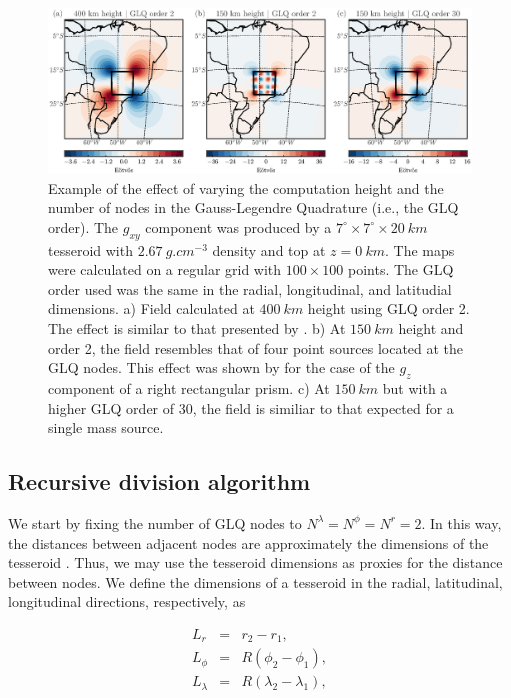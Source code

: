 \begin{figure}
    \centering
    \includegraphics[width=\textwidth]{figs/vary-height-and-order}
    \caption{
        Example of the effect of varying
        the computation height
        and the number of nodes in the Gauss-Legendre Quadrature
        (i.e., the GLQ order).
        The $g_{xy}$ component was produced by a
        $7^\circ \times 7^\circ \times 20\ km$ tesseroid
        with $2.67\ g.cm^{-3}$ density
        and top at $z=0\ km$.
        The maps were calculated on a regular grid
        with $100\times100$ points.
        The GLQ order used was the same
        in the radial, longitudinal, and latitudial dimensions.
        a) Field calculated at $400\ km$ height using GLQ order 2.
        The effect is similar to that presented by \citet{Asgharzadeh2007}.
        b) At $150\ km$ height and order 2,
        the field resembles that of
        four point sources located at the GLQ nodes.
        This effect was shown by \citet{Ku1977}
        for the case of the $g_z$ component of a right rectangular prism.
        c) At $150\ km$ but with a higher GLQ order of 30,
        the field is similiar to that expected for a single mass source.
    }
    \label{fig:sample}
\end{figure}


\subsection{Recursive division algorithm}

We start by fixing the number of GLQ nodes to
$N^\lambda=N^\phi=N^r=2$.
In this way, the distances between adjacent nodes
are approximately the dimensions of the tesseroid
\citep[see][]{Wild-Pfeiffer2008}.
Thus, we may use the tesseroid dimensions
as proxies for the distance between nodes.
We define the dimensions of a tesseroid
in the radial, latitudinal, longitudinal directions, respectively,
as

\begin{eqnarray}
    L_r &=& r_2 - r_1,\\
    L_\phi &=& R(\phi_2 - \phi_1),\\
    L_\lambda &=& R(\lambda_2 - \lambda_1),
\end{eqnarray}

